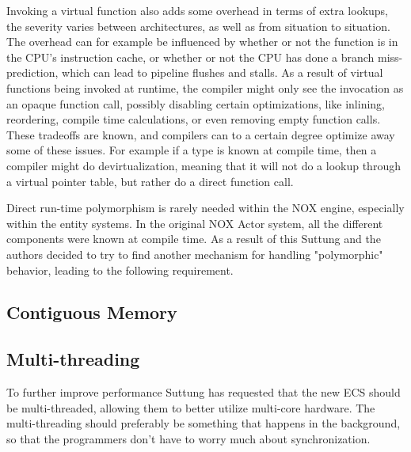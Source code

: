 Invoking a virtual function also adds some overhead in terms of extra lookups, the severity varies between architectures,
as well as from situation to situation.
The overhead can for example be influenced by whether or not the function is in the CPU's instruction cache,
or whether or not the CPU has done a branch miss-prediction, which can lead to pipeline flushes and stalls\cite{scott_meyers_cpu_caches_and_why_you_care}\cite[Data Locality]{game_programming_patterns}.
As a result of virtual functions being invoked at runtime, the compiler might only see the invocation as an opaque function call,
possibly disabling certain optimizations, like inlining, reordering, compile time calculations, or even removing empty function calls. 
These tradeoffs are known, and compilers can to a certain degree optimize away some of these issues.
For example if a type is known at compile time, then a compiler might do devirtualization,
meaning that it will not do a lookup through a virtual pointer table, but rather do a direct function call\cite{lazarenko_devirtualization}.

Direct run-time polymorphism is rarely needed within the NOX engine, especially within the entity systems.
In the original NOX Actor system, all the different components were known at compile time.
As a result of this Suttung and the authors decided to try to find another mechanism for handling "polymorphic" behavior,
leading to the following requirement.


\subsection{Contiguous Memory}
\label{subsec:requirements_performance_contiguous_memory}


\subsection{Multi-threading}
\label{subsec:requirements_performance_multi_threading}
To further improve performance Suttung has requested that the new ECS should be multi-threaded, allowing them to better utilize multi-core hardware.
The multi-threading should preferably be something that happens in the background, so that the programmers don't have to worry much about synchronization.

